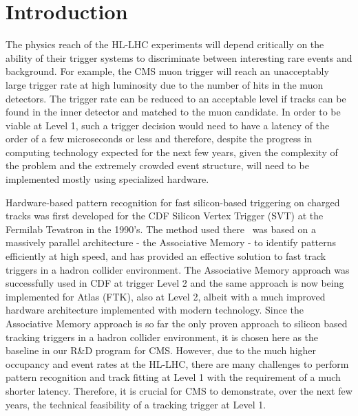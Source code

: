 \section{Introduction}

\noindent The physics reach of the HL-LHC experiments will depend critically on the ability of their trigger systems to discriminate between interesting rare events and background. For example, the CMS muon trigger will reach an unacceptably large trigger rate at high luminosity due to the number of hits in the muon detectors.  The trigger rate can be reduced to an acceptable level if tracks can be found in the inner detector and matched to the muon candidate. In order to be viable at Level 1, such a trigger decision would need to have a latency of the order of a few microseconds or less and therefore, despite the progress in computing technology expected for the next few years, given the complexity of the problem and the extremely crowded event structure, will need to be implemented mostly using specialized hardware.

\noindent Hardware-based pattern recognition for fast silicon-based triggering on charged tracks was first developed for the CDF Silicon Vertex Trigger (SVT) at the Fermilab Tevatron in the 1990's.  The method used there~\cite{bib:Rist-89} was based on a massively parallel architecture - the Associative Memory - to identify patterns efficiently at high speed, and has provided an effective solution to fast track triggers in a hadron collider environment. The Associative Memory approach was successfully used in CDF at trigger Level 2 and the same approach is now being implemented for Atlas (FTK), also at Level 2, albeit with a much improved hardware architecture implemented with modern technology.  Since the Associative Memory approach is so far the only proven approach to silicon based tracking triggers in a hadron collider environment, it is chosen here as the baseline in our R\&D program for CMS. However, due to the much higher occupancy and event rates at the HL-LHC, there are many challenges to perform pattern recognition and track fitting at Level 1 with the requirement of a much shorter latency. Therefore, it is crucial for CMS to demonstrate, over the next few years, the technical feasibility of a tracking trigger at Level 1. 

